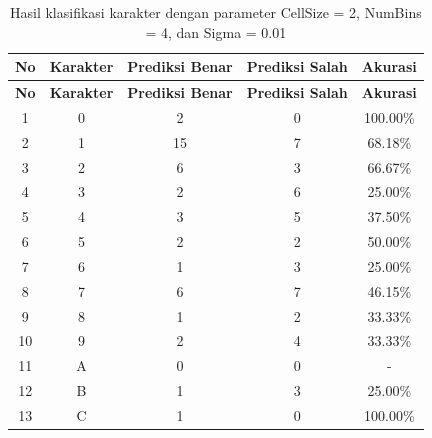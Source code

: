 \begin{longtable}[c]{|c|c|c|c|c|}
	\caption{Hasil klasifikasi karakter dengan parameter CellSize = 2, NumBins = 4, dan Sigma = 0.01}
	\label{tab:hasilklasifikasisel2}\\
	\hline
	\textbf{No} & \textbf{Karakter} & \textbf{Prediksi Benar} & \textbf{Prediksi Salah} & \textbf{Akurasi} \\ \hline
	\endfirsthead
	\hline
	\textbf{No} & \textbf{Karakter} & \textbf{Prediksi Benar} & \textbf{Prediksi Salah} & \textbf{Akurasi} \\ \hline
	\endhead
	1           & 0                 & 2                       & 0                       &100.00\%            \\ \hline
	2           & 1                 & 15                       & 7                       &68.18\%            \\ \hline
	3           & 2                 & 6                       & 3                       &66.67\%            \\ \hline
	4           & 3                 & 2                       & 6                       &25.00\%            \\ \hline
	5           & 4                 & 3                       & 5                       &37.50\%            \\ \hline
	6           & 5                 & 2                       & 2                       &50.00\%            \\ \hline
	7           & 6                 & 1                       & 3                       &25.00\%            \\ \hline
	8           & 7                 & 6                       & 7                       &46.15\%            \\ \hline
	9           & 8                 & 1                       & 2                       &33.33\%            \\ \hline
	10           & 9                 & 2                       & 4                       &33.33\%            \\ \hline
	11           & A                 & 0                       & 0                       & -            \\ \hline
	12           & B                 & 1                       & 3                       &25.00\%            \\ \hline
	13           & C                 & 1                       & 0                       &100.00\%            \\ \hline

\end{longtable}
